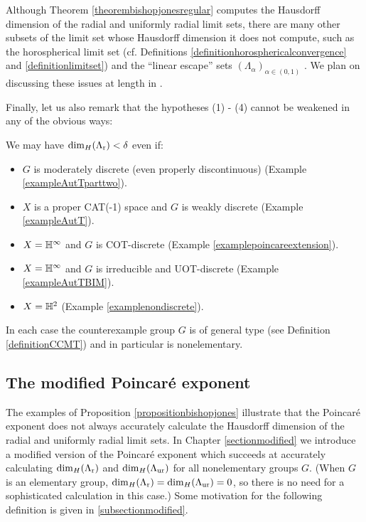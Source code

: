 \begin{remark*}
Although Theorem \ref{theorembishopjonesregular} computes the Hausdorff dimension of the radial and uniformly radial limit sets, there are many other subsets of the limit set whose Hausdorff dimension it does not compute, such as the horospherical limit set (cf. Definitions \ref{definitionhorosphericalconvergence} and \ref{definitionlimitset}) and the ``linear escape'' sets $(\Lambda_\alpha)_{\alpha\in (0,1)}$ \cite{Lundh}. We plan on discussing these issues at length in \cite{DSU2}.
\end{remark*}

Finally, let us also remark that the hypotheses (1) - (4) cannot be weakened in any of the obvious ways:
\begin{proposition}
\label{propositionbishopjones}
We may have ${\dim_H}(\Lambda_{\mathrm r}) < \delta$ even if:
\begin{itemize}
\item[(1)] $G$ is moderately discrete (even properly discontinuous) (Example \ref{exampleAutTparttwo}).
\item[(2)] $X$ is a proper CAT(-1) space and $G$ is weakly discrete (Example \ref{exampleAutT}).
\item[(3)] $X = \H^\infty$ and $G$ is COT-discrete (Example \ref{examplepoincareextension}).
\item[(4)] $X = \H^\infty$ and $G$ is irreducible and UOT-discrete (Example \ref{exampleAutTBIM}).
\item[(5)] $X = \H^2$ (Example \ref{examplenondiscrete}).
\end{itemize}
In each case the counterexample group $G$ is of general type (see Definition \ref{definitionCCMT}) and in particular is nonelementary.
\end{proposition}

\subsection{The modified Poincar\'e exponent}
The examples of Proposition \ref{propositionbishopjones} illustrate that the Poincar\'e exponent does not always accurately calculate the Hausdorff dimension of the radial and uniformly radial limit sets. In Chapter \ref{sectionmodified} we introduce a modified version of the Poincar\'e exponent which succeeds at accurately calculating ${\dim_H}(\Lambda_{\mathrm r})$ and ${\dim_H}(\Lambda_{\mathrm{ur}})$ for all nonelementary groups $G$. (When $G$ is an elementary group, ${\dim_H}(\Lambda_{\mathrm r}) = {\dim_H}(\Lambda_{\mathrm{ur}}) = 0$, so there is no need for a sophisticated calculation in this case.) Some motivation for the following definition is given in \6\ref{subsectionmodified}.

